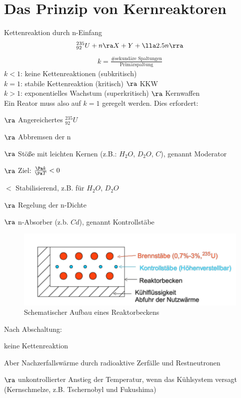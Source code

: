 \section{Das Prinzip von Kernreaktoren}
Kettenreaktion durch n-Einfang
\begin{align*}
^{235}_{92}U + n \ra X + Y + \lla 2.5 n\rra
\end{align*}
\begin{align*}
\boxed{k = \frac{\# \text{sekundäre Spaltungen}}{\text{Primärspaltung}}}
\end{align*}
$k<1$: keine Kettenreaktionen (subkritisch)\\
$k=1$: stabile Kettenreaktion (kritisch) $\ra$ KKW\\
$k>1$: exponentielles Wachstum (superkritisch) $\ra$ Kernwaffen\\
Ein Reator muss also auf $k=1$ geregelt werden. Dies erfordert:
\begin{compactitem}
\item[$\ra$] Angereichertes $^{235}_{92}U$
\item[$\ra$] Abbremsen der n
\begin{compactitem}
\item[$\ra$] Stöße mit leichten Kernen (z.B.: $H_2O$, $D_2O$, $C$), genannt \glqq Moderator\grqq{}
\item[$\ra$] Ziel: $\frac{\Pa k}{\Pa T} < 0$
\begin{compactitem}
\item[$\lt$] Stabilisierend, z.B. für $H_2O$, $D_2O$
\end{compactitem}
\end{compactitem}
\item[$\ra$] Regelung der n-Dichte
\begin{compactitem}
\item[$\ra$] n-Absorber (z.b. $Cd$), genannt \glqq Kontrollstäbe\grqq{}
\end{compactitem}
\end{compactitem}
\begin{figure}[!ht]
\centering
\includegraphics[width=.6\textwidth]{imgs/ep5-fig-5-17.pdf}
\caption{Schematischer Aufbau eines Reaktorbeckens \label{fig:5.17}}
\end{figure}
Nach Abschaltung:
\begin{compactitem}
\item keine Kettenreaktion
\item Aber \glqq Nachzerfallswärme\grqq{} durch radioaktive Zerfälle und Restneutronen
\item[$\ra$] unkontrollierter Anstieg der Temperatur, wenn das Kühlsystem versagt (\glqq Kernschmelze\grqq{}, z.B. Tschernobyl und Fukushima)
\end{compactitem}

